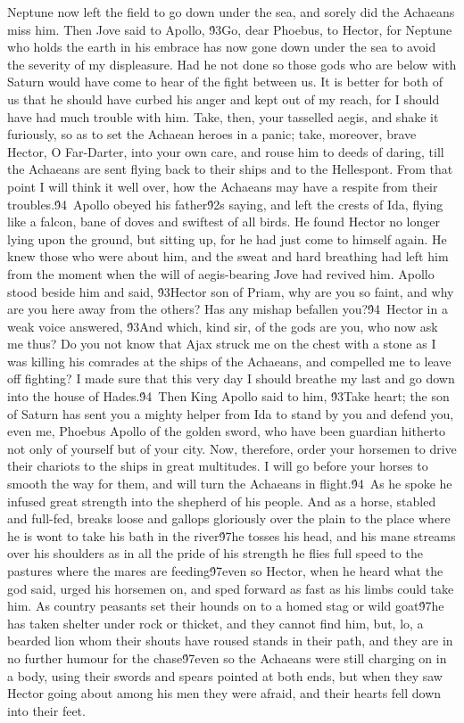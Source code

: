{Neptune now left the field to go down under the sea, and sorely did the Achaeans miss him. Then Jove said to Apollo, \'93Go, dear Phoebus, to Hector, for Neptune who holds the earth in his embrace has now gone down under the sea to avoid the severity of my displeasure. Had he not done so those gods who are below with Saturn would have come to hear of the fight between us. It is better for both of us that he should have curbed his anger and kept out of my reach, for I should have had much trouble with him. Take, then, your tasselled aegis, and shake it furiously, so as to set the Achaean heroes in a panic; take, moreover, brave Hector, O Far-Darter, into your own care, and rouse him to deeds of daring, till the Achaeans are sent flying back to their ships and to the Hellespont. From that point I will think it well over, how the Achaeans may have a respite from their troubles.\'94\
Apollo obeyed his father\'92s saying, and left the crests of Ida, flying like a falcon, bane of doves and swiftest of all birds. He found Hector no longer lying upon the ground, but sitting up, for he had just come to himself again. He knew those who were about him, and the sweat and hard breathing had left him from the moment when the will of aegis-bearing Jove had revived him. Apollo stood beside him and said, \'93Hector son of Priam, why are you so faint, and why are you here away from the others? Has any mishap befallen you?\'94\
Hector in a weak voice answered, \'93And which, kind sir, of the gods are you, who now ask me thus? Do you not know that Ajax struck me on the chest with a stone as I was killing his comrades at the ships of the Achaeans, and compelled me to leave off fighting? I made sure that this very day I should breathe my last and go down into the house of Hades.\'94\
Then King Apollo said to him, \'93Take heart; the son of Saturn has sent you a mighty helper from Ida to stand by you and defend you, even me, Phoebus Apollo of the golden sword, who have been guardian hitherto not only of yourself but of your city. Now, therefore, order your horsemen to drive their chariots to the ships in great multitudes. I will go before your horses to smooth the way for them, and will turn the Achaeans in flight.\'94\
As he spoke he infused great strength into the shepherd of his people. And as a horse, stabled and full-fed, breaks loose and gallops gloriously over the plain to the place where he is wont to take his bath in the river\'97he tosses his head, and his mane streams over his shoulders as in all the pride of his strength he flies full speed to the pastures where the mares are feeding\'97even so Hector, when he heard what the god said, urged his horsemen on, and sped forward as fast as his limbs could take him. As country peasants set their hounds on to a homed stag or wild goat\'97he has taken shelter under rock or thicket, and they cannot find him, but, lo, a bearded lion whom their shouts have roused stands in their path, and they are in no further humour for the chase\'97even so the Achaeans were still charging on in a body, using their swords and spears pointed at both ends, but when they saw Hector going about among his men they were afraid, and their hearts fell down into their feet.\
}
